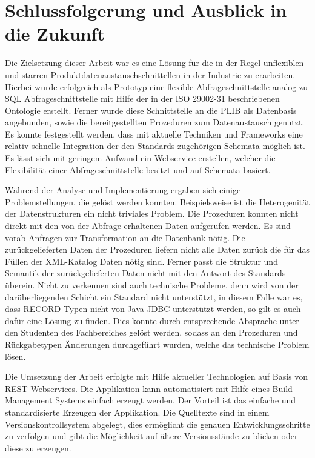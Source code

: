 \chapter*{Schlussfolgerung und Ausblick in die Zukunft}


Die Zielsetzung dieser Arbeit war es eine Lösung für die in der Regel unflexiblen und starren Produktdatenaustauschschnittellen in der Industrie zu erarbeiten. Hierbei wurde erfolgreich als Prototyp eine flexible \gls{Abfrageschnittstelle} analog zu SQL \gls{Abfrageschnittstelle} mit Hilfe der in der ISO 29002-31 beschriebenen \gls{Ontologie} erstellt. Ferner wurde diese Schnittstelle an die \gls{PLIB} als Datenbasis angebunden, sowie die bereitgestellten Prozeduren zum Datenaustausch genutzt. Es konnte festgestellt werden, dass mit aktuelle Techniken und Frameworks eine relativ schnelle Integration der den Standards zugehörigen Schemata möglich ist. Es lässt sich mit geringem Aufwand ein \gls{Webservice} erstellen, welcher die Flexibilität einer \gls{Abfrageschnittstelle} besitzt und auf Schemata basiert.  

Während der Analyse und Implementierung ergaben sich einige Problemstellungen, die gelöst werden konnten. Beispielsweise ist die Heterogenität der Datenstrukturen ein nicht triviales Problem. Die Prozeduren konnten nicht direkt mit den von der Abfrage erhaltenen Daten aufgerufen werden. Es sind vorab Anfragen zur Transformation an die Datenbank nötig. 
Die zurückgelieferten Daten der Prozeduren liefern nicht alle Daten zurück die für das Füllen der XML-Katalog Daten nötig sind. Ferner passt die Struktur und Semantik der zurückgelieferten Daten nicht mit den Antwort des Standards überein. Nicht zu verkennen sind auch technische Probleme, denn wird von der darüberliegenden Schicht ein Standard nicht unterstützt, in diesem Falle war es, dass RECORD-Typen nicht von Java-JDBC unterstützt werden, so gilt es auch dafür eine Lösung zu finden. 
Dies konnte durch entsprechende Absprache unter den Studenten des Fachbereiches gelöst werden, sodass an den Prozeduren und Rückgabetypen Änderungen durchgeführt wurden, welche das technische Problem lösen.

Die Umsetzung der Arbeit erfolgte mit Hilfe aktueller Technologien auf Basis von \gls{REST} \glspl{Webservice}. Die Applikation kann automatisiert mit Hilfe eines Build Management Systems einfach erzeugt werden. Der Vorteil ist das einfache und standardisierte Erzeugen der Applikation. Die Quelltexte sind in einem Versionskontrollsystem abgelegt, dies ermöglicht die genauen Entwicklungsschritte zu verfolgen und gibt die Möglichkeit auf ältere Versionsstände zu blicken oder diese zu erzeugen. 

